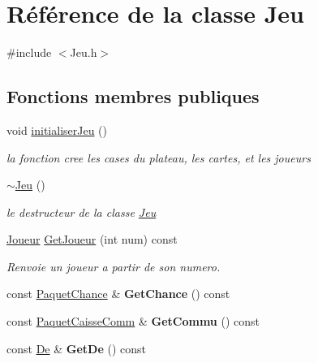 \hypertarget{classJeu}{}\section{Référence de la classe Jeu}
\label{classJeu}


{\ttfamily \#include $<$Jeu.\+h$>$}

\subsection*{Fonctions membres publiques}
\begin{DoxyCompactItemize}
\item 
void \hyperlink{classJeu_a437282d939ce54d7f3e2eeb56dc0fce7}{initialiser\+Jeu} ()
\begin{DoxyCompactList}\small\item\em la fonction cree les cases du plateau, les cartes, et les joueurs \end{DoxyCompactList}\item 
\hyperlink{classJeu_a9cd19e73df169d7f09397be61ba8548c}{$\sim$\+Jeu} ()
\begin{DoxyCompactList}\small\item\em le destructeur de la classe \hyperlink{classJeu}{Jeu} \end{DoxyCompactList}\item 
\hyperlink{classJoueur}{Joueur} \hyperlink{classJeu_a0b91f25bdd13913a49d73f4a4f30fa10}{Get\+Joueur} (int num) const 
\begin{DoxyCompactList}\small\item\em Renvoie un joueur a partir de son numero. \end{DoxyCompactList}\item 
const \hyperlink{classPaquetChance}{Paquet\+Chance} \& {\bfseries Get\+Chance} () const \hypertarget{classJeu_a66c298cd9ce97d8c24fbb4109a880e4c}{}\label{classJeu_a66c298cd9ce97d8c24fbb4109a880e4c}

\item 
const \hyperlink{classPaquetCaisseComm}{Paquet\+Caisse\+Comm} \& {\bfseries Get\+Commu} () const \hypertarget{classJeu_a538b9fc6dc3ccaa6a2adb7be6cb039a3}{}\label{classJeu_a538b9fc6dc3ccaa6a2adb7be6cb039a3}

\item 
const \hyperlink{classDe}{De} \& {\bfseries Get\+De} () const \hypertarget{classJeu_a371fdcc4ce95122aedaa4011f6a84dd8}{}\label{classJeu_a371fdcc4ce95122aedaa4011f6a84dd8}


\end{DoxyCompactItemize}
